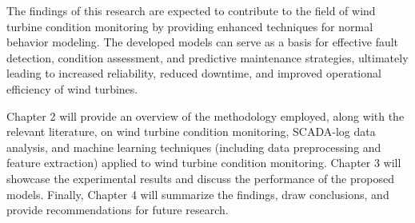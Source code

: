 \par The findings of this research are expected to contribute to the field of wind turbine condition monitoring by providing enhanced techniques for normal behavior modeling. 
The developed models can serve as a basis for effective fault detection, condition assessment, and predictive maintenance strategies, ultimately leading to increased reliability, reduced downtime, and improved operational efficiency of wind turbines.

\par Chapter 2 will provide an overview of the methodology employed, along with the relevant literature, on wind turbine condition monitoring, SCADA-log data analysis, and machine learning techniques 
(including data preprocessing and feature extraction) applied to wind turbine condition monitoring. 
Chapter 3 will showcase the experimental results and discuss the performance of the proposed models. 
Finally, Chapter 4 will summarize the findings, draw conclusions, and provide recommendations for future research.



